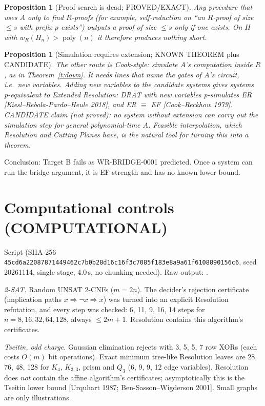 \documentclass[11pt]{article}
\newtheorem{proposition}[theorem]{Proposition}
\newcommand{\poly}{\operatorname{poly}}
\begin{document}
\begin{proposition}[Proof search is dead; PROVED/EXACT]\label{p:search}
Any procedure that uses $A$ only to \emph{find} $R$-proofs (for example,
self-reduction on ``an $R$-proof of size $\le s$ with prefix $p$ exists'')
outputs a proof of size $\le s$ only if one exists. On $H$ with
$w_R(H_n)>\poly(n)$ it therefore produces nothing short.
\end{proposition}

\begin{proposition}[Simulation requires extension; KNOWN THEOREM plus CANDIDATE]\label{p:sim}
The other route is Cook-style: simulate $A$'s computation inside $R$, as in
Theorem~\ref{t:down}. It needs lines that name the gates of $A$'s circuit,
i.e.\ new variables. Adding new variables to the candidate systems gives
systems p-equivalent to Extended Resolution: DRAT with new variables
p-simulates ER [Kiesl--Rebola-Pardo--Heule 2018], and ER $\equiv$ EF
[Cook--Reckhow 1979]. CANDIDATE claim (not proved): no system without
extension can carry out the simulation step for general polynomial-time
$A$. Feasible interpolation, which Resolution and Cutting Planes have,
is the natural tool for turning this into a theorem.
\end{proposition}
Conclusion: Target B fails as WR-BRIDGE-0001 predicted. Once a system can
run the bridge argument, it is EF-strength and has no known lower bound.

\section{Computational controls (COMPUTATIONAL)}
Script 
(SHA-256 \texttt{45cd6a22087871449462c7b0b28d16c16f3c7085f183e8a9a61f6108890156c6},
seed 20261114, single stage, 4.0\,s, no chunking needed). Raw output:
.

\emph{2-SAT.} Random UNSAT 2-CNFs ($m=2n$). The decider's rejection
certificate (implication paths $x\Rightarrow\neg x\Rightarrow x$) was turned
into an explicit Resolution refutation, and every step was checked:
6, 11, 9, 16, 14 steps for $n=8,16,32,64,128$, always $\le 2m+1$. Resolution
contains this algorithm's certificates.

\emph{Tseitin, odd charge.} Gaussian elimination rejects with 3, 5, 5, 7
row XORs (each costs $O(m)$ bit operations). Exact minimum tree-like
Resolution leaves are 28, 76, 48, 128 for $K_4$, $K_{3,3}$, prism and $Q_3$
(6, 9, 9, 12 edge variables). Resolution does \emph{not} contain the affine
algorithm's certificates; asymptotically this is the Tseitin lower bound
[Urquhart 1987; Ben-Sasson--Wigderson 2001]. Small graphs are only
illustrations.
\end{document}
